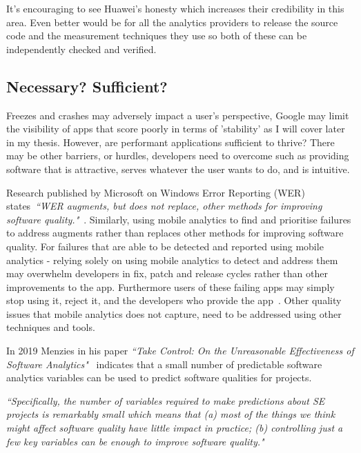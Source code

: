 It's encouraging to see Huawei's honesty which increases their credibility in this area. Even better would be for all the analytics providers to release the source code and the measurement techniques they use so both of these can be independently checked and verified.


\subsection{Necessary? Sufficient?}
Freezes and crashes may adversely impact a user's perspective, Google may limit the visibility of apps that score poorly in terms of 'stability' as I will cover later in my thesis. However, are performant applications sufficient to thrive? There may be other barriers, or hurdles, developers need to overcome such as providing software that is attractive, serves whatever the user wants to do, and is intuitive.

Research published by Microsoft on Windows Error Reporting (WER) states~\emph{``WER augments, but does not replace, other methods for improving software quality."}~\citep{kinshuman2009_debugging_in_the_very_large, kinshuman2011_debugging_in_the_very_large}. Similarly, using mobile analytics to find and prioritise failures to address augments rather than replaces other methods for improving software quality. For failures that are able to be detected and reported using mobile analytics - relying solely on using mobile analytics to detect and address them may overwhelm developers in fix, patch and release cycles rather than other improvements to the app. Furthermore users of these failing apps may simply stop using it, reject it, and the developers who provide the app~\citep{dimensionalresearch2015_mobile_app_use_and_abandonment}. Other quality issues that mobile analytics does not capture, need to be addressed using other techniques and tools.

In 2019 Menzies in his paper \emph{``Take Control: On the Unreasonable Effectiveness of Software Analytics"}~\cite{menzies2019take} indicates that a small number of predictable software analytics variables can be used to predict software qualities for projects. 

\emph{``Specifically, the number of variables required to make predictions about SE projects is remarkably small which means that (a) most of the things we think might affect software quality have little impact in practice; (b) controlling just a few key variables can be enough to improve software quality."}


